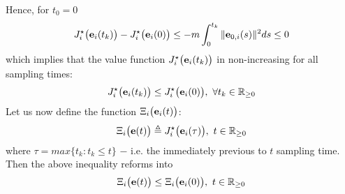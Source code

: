 Hence, for $t_0 = 0$
\begin{align}
  J_i^{\star}\big(\bm{\mathbf{e}}_i(t_{k})\big) - J_i^{\star}\big(\bm{\mathbf{e}}_i(0)\big) \leq
    -m \int_{0}^{t_{k}} \|\bm{\mathbf{e}}_{0,i}(s)\|^2 ds \leq 0
\label{eq:J_opt_between_k_and_0}
\end{align}
which implies that the value function $J_i^{\star}\big(\bm{\mathbf{e}}_i(t_{k})\big)$
in non-increasing for all sampling times:
\begin{align}
  J_i^{\star}\big(\bm{\mathbf{e}}_i(t_{k})\big) \leq J_i^{\star}\big(\bm{\mathbf{e}}_i(0)\big),\ \forall t_k \in \mathbb{R}_{\geq0}
\end{align}
Let us now define the function $\Xi_i\big(\bm{\mathbf{e}}_i(t)\big)$:
\begin{align}
  \Xi_i\big(\bm{\mathbf{e}}(t)\big) \triangleq J_i^{\star}\big(\bm{\mathbf{e}}_i(\tau)\big),\ t \in \mathbb{R}_{\geq0}
\end{align}
where $\tau = max\{t_k : t_k \leq t\}$ $-$ i.e. the immediately previous to
$t$ sampling time. Then the above inequality reforms into
\begin{align}
  \Xi_i\big(\bm{\mathbf{e}}(t)\big) \leq \Xi_i\big(\bm{\mathbf{e}}_i(0)\big),\ t \in \mathbb{R}_{\geq0}
\end{align}

